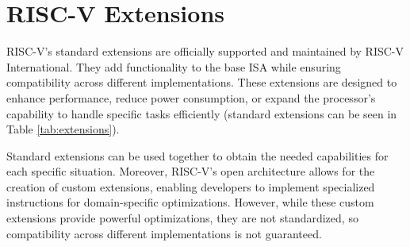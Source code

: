 \section{RISC-V Extensions}
\label{sec:riscv_extensions}

RISC-V’s standard extensions are officially supported and maintained by RISC-V International.
They add functionality to the base ISA while ensuring compatibility across
different implementations. These extensions are designed to enhance performance,
reduce power consumption, or expand the processor's capability to handle specific
tasks efficiently (standard extensions can be seen in Table \ref{tab:extensions}).

Standard extensions can be used together to obtain the needed capabilities for each
specific situation. Moreover, RISC-V’s open architecture allows for the creation
of custom extensions, enabling developers to implement specialized instructions
for domain-specific optimizations. However, while these custom extensions
provide powerful optimizations, they are not standardized, so compatibility
across different implementations is not guaranteed.

